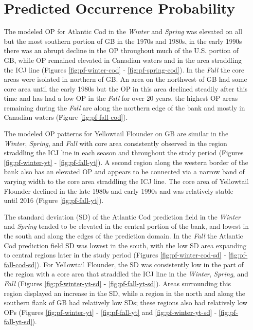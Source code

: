 \documentclass[
]{article}
\begin{document}
\clearpage

\hypertarget{predicted-occurrence-probability}{%
\section{Predicted Occurrence Probability}\label{predicted-occurrence-probability}}

The modeled OP for Atlantic Cod in the \emph{Winter} and \emph{Spring} was elevated on all but the most southern portion of GB in the 1970s and 1980s, in the early 1990s there was an abrupt decline in the OP throughout much of the U.S. portion of GB, while OP remained elevated in Canadian waters and in the area straddling the ICJ line (Figures \ref{fig:pf-winter-cod} - \ref{fig:pf-spring-cod}). In the \emph{Fall} the core areas were isolated in northern of GB. An area on the northwest of GB had some core area until the early 1980s but the OP in this area declined steadily after this time and has had a low OP in the \emph{Fall} for over 20 years, the highest OP areas remaining during the \emph{Fall} are along the northern edge of the bank and mostly in Canadian waters (Figure \ref{fig:pf-fall-cod}).

The modeled OP patterns for Yellowtail Flounder on GB are similar in the \emph{Winter}, \emph{Spring}, and \emph{Fall} with core area consistently observed in the region straddling the ICJ line in each season and throughout the study period (Figures \ref{fig:pf-winter-yt} - \ref{fig:pf-fall-yt}). A second region along the western border of the bank also has an elevated OP and appears to be connected via a narrow band of varying width to the core area straddling the ICJ line. The core area of Yellowtail Flounder declined in the late 1980s and early 1990s and was relatively stable until 2016 (Figure \ref{fig:pf-fall-yt}).

The standard deviation (SD) of the Atlantic Cod prediction field in the \emph{Winter} and \emph{Spring} tended to be elevated in the central portion of the bank, and lowest in the south and along the edges of the prediction domain. In the \emph{Fall} the Atlantic Cod prediction field SD was lowest in the south, with the low SD area expanding to central regions later in the study period (Figures \ref{fig:pf-winter-cod-sd} - \ref{fig:pf-fall-cod-sd}). For Yellowtail Flounder, the SD was consistently low in the part of the region with a core area that straddled the ICJ line in the \emph{Winter}, \emph{Spring}, and \emph{Fall} (Figures \ref{fig:pf-winter-yt-sd} - \ref{fig:pf-fall-yt-sd}). Areas surrounding this region displayed an increase in the SD, while a region in the north and along the southern flank of GB had relatively low SDs; these regions also had relatively low OPs (Figures \ref{fig:pf-winter-yt} - \ref{fig:pf-fall-yt} and \ref{fig:pf-winter-yt-sd} - \ref{fig:pf-fall-yt-sd}).
\end{document}
